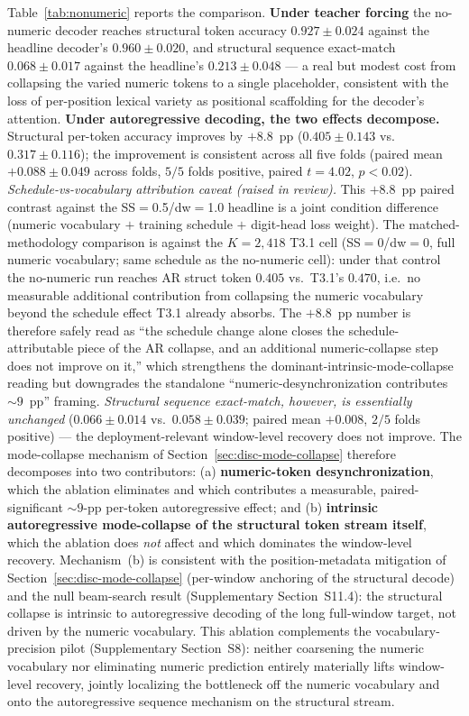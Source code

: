 \documentclass[sensors,article,submit,moreauthors,pdftex]{Definitions/mdpi}
\begin{document}
Table~\ref{tab:nonumeric} reports the comparison. \textbf{Under teacher
forcing} the no-numeric decoder reaches structural token accuracy
$0.927 \pm 0.024$ against the headline decoder's $0.960 \pm 0.020$, and
structural sequence exact-match $0.068 \pm 0.017$ against the headline's
$0.213 \pm 0.048$ --- a real but modest cost from collapsing the varied
numeric tokens to a single placeholder, consistent with the loss of
per-position lexical variety as positional scaffolding for the decoder's
attention. \textbf{Under autoregressive decoding, the two effects decompose.}
Structural per-token accuracy improves by $+8.8$~pp ($0.405 \pm 0.143$ vs.\
$0.317 \pm 0.116$); the improvement is consistent across all five folds
(paired mean $+0.088 \pm 0.049$ across folds, $5/5$ folds positive,
paired $t=4.02$, $p\!<\!0.02$). \emph{Schedule-vs-vocabulary attribution
caveat (raised in review).} This $+8.8$~pp paired contrast against the
SS$=$0.5/dw$=$1.0 headline is a joint condition difference (numeric
vocabulary $+$ training schedule $+$ digit-head loss weight). The
matched-methodology comparison is against the $K\!=\!2{,}418$ T3.1 cell
(SS$=$0/dw$=$0, full numeric vocabulary; same schedule as the
no-numeric cell): under that control the no-numeric run reaches AR struct
token $0.405$ vs.\ T3.1's $0.470$, i.e.\ no measurable additional
contribution from collapsing the numeric vocabulary beyond the schedule
effect T3.1 already absorbs. The $+8.8$~pp number is therefore safely
read as ``the schedule change alone closes the schedule-attributable
piece of the AR collapse, and an additional numeric-collapse step does
not improve on it,'' which strengthens the dominant-intrinsic-mode-collapse
reading but downgrades the standalone ``numeric-desynchronization
contributes $\sim\!9$~pp'' framing. \emph{Structural sequence exact-match, however,
is essentially unchanged} ($0.066 \pm 0.014$ vs.\ $0.058 \pm 0.039$; paired
mean $+0.008$, $2/5$ folds positive) --- the deployment-relevant window-level
recovery does not improve. The mode-collapse mechanism of
Section~\ref{sec:disc-mode-collapse} therefore decomposes into two
contributors: (a) \textbf{numeric-token desynchronization}, which the ablation
eliminates and which contributes a measurable, paired-significant
$\sim$$9$-pp per-token autoregressive effect; and (b) \textbf{intrinsic
autoregressive mode-collapse of the structural token stream itself}, which the
ablation does \emph{not} affect and which dominates the window-level
recovery. Mechanism~(b) is consistent with the position-metadata mitigation
of Section~\ref{sec:disc-mode-collapse} (per-window anchoring of the structural
decode) and the null beam-search result (Supplementary Section~S11.4): the
structural collapse is intrinsic to autoregressive decoding of the long
full-window target, not driven by the numeric vocabulary. This ablation
complements the vocabulary-precision pilot (Supplementary Section~S8):
neither coarsening the numeric vocabulary nor eliminating numeric prediction
entirely materially lifts window-level recovery, jointly localizing the
bottleneck off the numeric vocabulary and onto the autoregressive sequence
mechanism on the structural stream.
\end{document}
